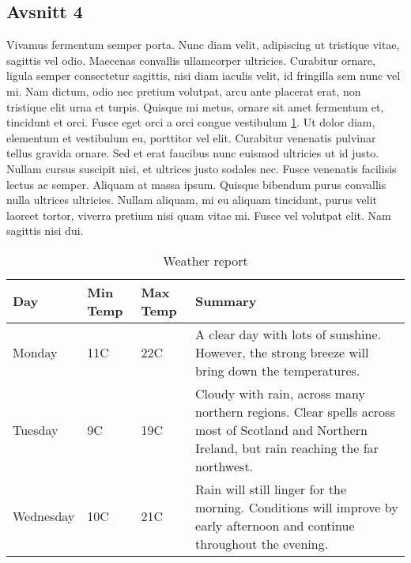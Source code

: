 \documentclass[12pt]{article}
\begin{document}
\subsection{Avsnitt 4}
\label{sec-1-2}
Vivamus fermentum semper porta. Nunc diam velit, adipiscing ut tristique vitae, sagittis vel odio. Maecenas convallis ullamcorper ultricies. Curabitur ornare, ligula semper consectetur sagittis, nisi diam iaculis velit, id fringilla sem nunc vel mi. Nam dictum, odio nec pretium volutpat, arcu ante placerat erat, non tristique elit urna et turpis. Quisque mi metus, ornare sit amet fermentum et, tincidunt et orci. Fusce eget orci a orci congue vestibulum \ref{tab:weather}. Ut dolor diam, elementum et vestibulum eu, porttitor vel elit. Curabitur venenatis pulvinar tellus gravida ornare. Sed et erat faucibus nunc euismod ultricies ut id justo. Nullam cursus suscipit nisi, et ultrices justo sodales nec. Fusce venenatis facilisis lectus ac semper. Aliquam at massa ipsum. Quisque bibendum purus convallis nulla ultrices ultricies. Nullam aliquam, mi eu aliquam tincidunt, purus velit laoreet tortor, viverra pretium nisi quam vitae mi. Fusce vel volutpat elit. Nam sagittis nisi dui.

\begin{table}[htbp]
\begin{center}
     \begin{tabular}{ | l | l | l | p{5cm} |}
     \hline
     Day & Min Temp & Max Temp & Summary \\ \hline
     Monday & 11C & 22C & A clear day with lots of sunshine.
     However, the strong breeze will bring down the temperatures. \\ \hline
     Tuesday & 9C & 19C & Cloudy with rain, across many northern regions. Clear spells
     across most of Scotland and Northern Ireland,
     but rain reaching the far northwest. \\ \hline
     Wednesday & 10C & 21C & Rain will still linger for the morning.
     Conditions will improve by early afternoon and continue
     throughout the evening. \\
     \hline
     \end{tabular}
\end{center}
\caption{Weather report}
\label{tab:weather}
\end{table}



\newpage


\end{document}
